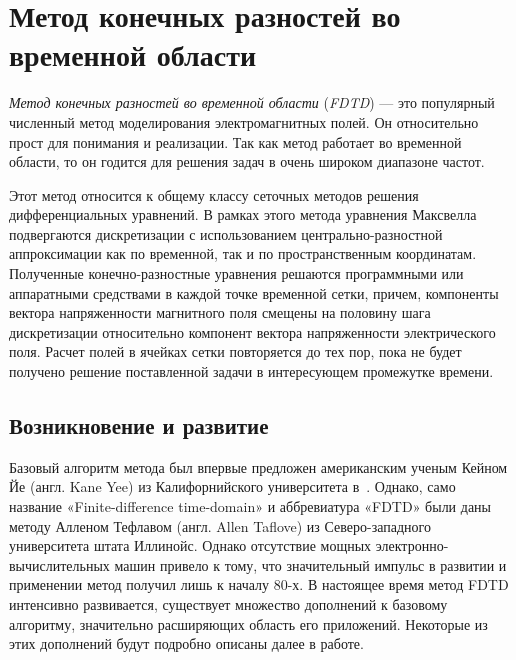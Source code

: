 \section{Метод конечных разностей во временной области}
\label{section:CoreMethod}

\emph{Метод конечных разностей во временной области} (\emph{FDTD}) --- это
популярный численный метод моделирования электромагнитных полей. Он относительно
прост для понимания и реализации. Так как метод работает во временной области,
то он годится для решения задач в очень широком диапазоне частот.

Этот метод относится к общему классу сеточных методов решения дифференциальных
уравнений. В рамках этого метода уравнения Максвелла подвергаются дискретизации
с использованием центрально-разностной аппроксимации как по временной, так и по
пространственным координатам. Полученные конечно-разностные уравнения решаются
программными или аппаратными средствами в каждой точке временной сетки, причем,
компоненты вектора напряженности магнитного поля смещены на половину шага
дискретизации относительно компонент вектора напряженности электрического поля.
Расчет полей в ячейках сетки повторяется до тех пор, пока не будет получено
решение поставленной задачи в интересующем промежутке времени.


\subsection{Возникновение и развитие}

Базовый алгоритм метода был впервые предложен американским ученым Кейном Йе
(англ. Kane Yee) из Калифорнийского университета в~\cite{bib:Yee1966}. Однако,
само название «Finite-difference time-domain» и аббревиатура «FDTD» были даны
методу Алленом Тефлавом (англ. Allen Taflove) из Северо-западного университета
штата Иллинойс. Однако отсутствие мощных электронно-вычислительных машин привело
к тому, что
значительный импульс в развитии и применении метод получил лишь к началу 80-х.
В настоящее время метод FDTD интенсивно развивается, существует множество
дополнений к базовому алгоритму, значительно расширяющих область его приложений.
Некоторые из этих дополнений будут подробно описаны далее в работе.

